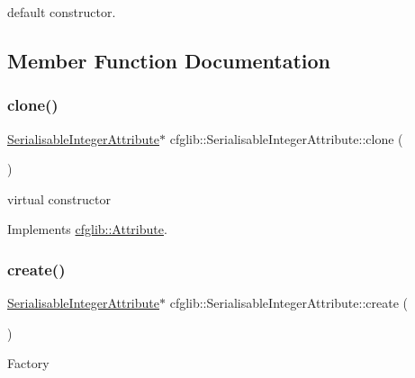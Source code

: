 default constructor. 

\subsection{Member Function Documentation}
\mbox{\label{classcfglib_1_1SerialisableIntegerAttribute_a105ce2b9dab265d56bc3229fcb7d6084}} 
\subsubsection{\texorpdfstring{clone()}{clone()}}
{\footnotesize\ttfamily \hyperlink{classcfglib_1_1SerialisableIntegerAttribute}{Serialisable\+Integer\+Attribute}$\ast$ cfglib\+::\+Serialisable\+Integer\+Attribute\+::clone (\begin{DoxyParamCaption}{ }\end{DoxyParamCaption})\hspace{0.3cm}{\ttfamily [virtual]}}

virtual constructor 

Implements \hyperlink{classcfglib_1_1Attribute_a107366042fdafe881215426059fec3f8}{cfglib\+::\+Attribute}.

\mbox{\label{classcfglib_1_1SerialisableIntegerAttribute_ae8b6996fa450b48c0ca1eb79cba008c2}} 
\subsubsection{\texorpdfstring{create()}{create()}}
{\footnotesize\ttfamily \hyperlink{classcfglib_1_1SerialisableIntegerAttribute}{Serialisable\+Integer\+Attribute}$\ast$ cfglib\+::\+Serialisable\+Integer\+Attribute\+::create (\begin{DoxyParamCaption}{ }\end{DoxyParamCaption})\hspace{0.3cm}{\ttfamily [virtual]}}

Factory 

